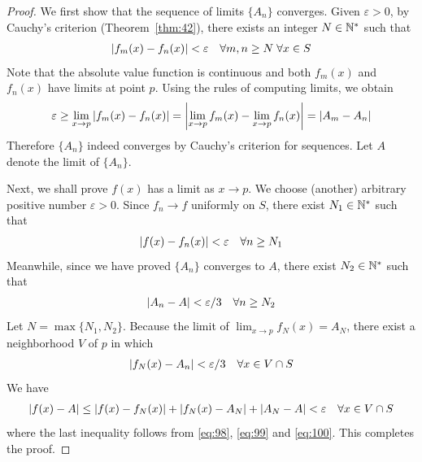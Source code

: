 \documentclass[thmcnt=section, 12pt]{my-elegantbook}
\begin{document}
\begin{proof}
    We first show that the sequence of limits $\{A_n\}$ converges. Given $\varepsilon > 0$, by Cauchy's criterion (Theorem~\ref{thm:42}), there exists an integer $N \in \mathbb{N}^\ast$ such that
    \begin{align*}
        \left\lvert f_m(x) - f_n(x) \right\rvert < \varepsilon
        \quad \forall m,n \geq N \; \forall x \in S
    \end{align*}
    Note that the absolute value function is continuous and both $f_m(x)$ and $f_n(x)$ have limits at point $p$. Using the rules of computing limits, we obtain
    \begin{align*}
        \varepsilon \geq \lim_{x \to p} \left\lvert f_m(x) - f_n(x) \right\rvert
        = \left\lvert  \lim_{x \to p} f_m(x) - \lim_{x \to p} f_n(x)  \right\rvert
        = \left\lvert A_m - A_n \right\rvert
    \end{align*}
    Therefore $\{A_n\}$ indeed converges by Cauchy's criterion for sequences. Let $A$ denote the limit of $\{A_n\}$.

    Next, we shall prove $f(x)$ has a limit as $ x \to p$. We choose (another) arbitrary positive number $\varepsilon > 0$. Since $f_n \to f$ uniformly on $S$, there exist $N_1 \in \mathbb{N}^\ast$ such that
    \begin{align}
        \left\lvert f(x) - f_n(x) \right\rvert < \varepsilon
        \quad \forall n \geq N_1
        \label{eq:98}
    \end{align}
    Meanwhile, since we have proved $\{A_n\}$ converges to $A$, there exist $N_2 \in \mathbb{N}^\ast$ such that
    \begin{align}
        \left\lvert A_n - A \right\rvert
        < \varepsilon / 3
        \quad \forall n \geq N_2
        \label{eq:99}
    \end{align}
    Let $N = \max\{N_1, N_2\}$. Because the limit of $\lim_{x \to p} f_N(x) = A_N$, there exist a neighborhood $V$ of $p$ in which
    \begin{align}
        \left\lvert f_N(x) - A_n \right\rvert < \varepsilon / 3
        \quad \forall x \in V \cap S
        \label{eq:100}
    \end{align}
    We have
    \begin{align*}
        \left\lvert f(x) - A \right\rvert
        \leq \left\lvert f(x) - f_N(x) \right\rvert
        + \left\lvert f_N(x) - A_N \right\rvert
        + \left\lvert A_N - A \right\rvert
        < \varepsilon
        \quad \forall x \in V \cap S
    \end{align*}
    where the last inequality follows from \eqref{eq:98}, \eqref{eq:99} and \eqref{eq:100}. This completes the proof.
\end{proof}
\end{document}
